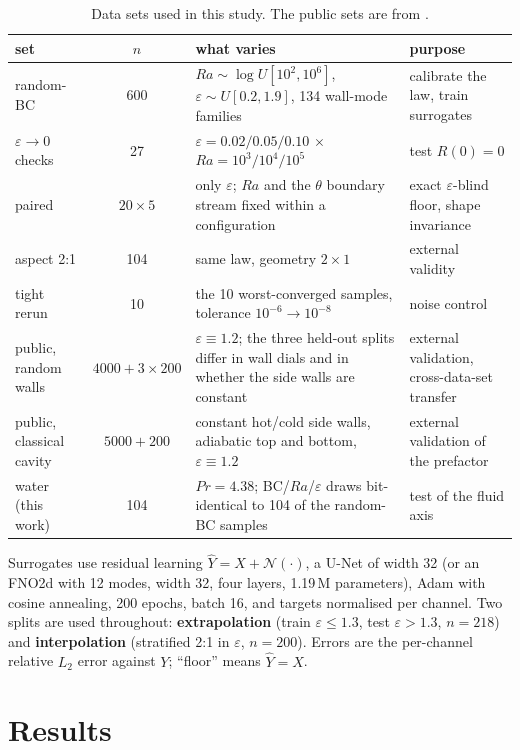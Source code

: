\documentclass[11pt,a4paper]{article}
\begin{document}
\begin{table}[htbp]
\centering
\footnotesize
\setlength{\tabcolsep}{4pt}
\caption{Data sets used in this study. The public sets are from
\citet{menglik2026neural}.}
\label{tab:data}
\begin{tabular}{@{}p{4.2cm}c p{5.8cm}p{3.7cm}@{}}
\toprule
set & $n$ & what varies & purpose\\
\midrule
random-BC & 600 & $Ra\sim\log U[10^2,10^6]$, $\varepsilon\sim U[0.2,1.9]$, 134 wall-mode
families & calibrate the law, train surrogates\\
$\varepsilon\to0$ checks & 27 & $\varepsilon=0.02/0.05/0.10$ $\times$ $Ra=10^3/10^4/10^5$ &
test $R(0)=0$\\
paired & $20\times5$ & only $\varepsilon$; $Ra$ and the $\theta$ boundary stream fixed within a
configuration & exact $\varepsilon$-blind floor, shape invariance\\
aspect 2:1 & 104 & same law, geometry $2\times1$ & external validity\\
tight rerun & 10 & the 10 worst-converged samples, tolerance $10^{-6}\to10^{-8}$ & noise control\\
public, random walls \citep{menglik2026neural} & $4000+3\times200$ & $\varepsilon\equiv1.2$; the
three held-out splits differ in wall dials and in whether the side walls are constant & external
validation, cross-data-set transfer\\
public, classical cavity \citep{menglik2026neural} & $5000+200$ & constant hot/cold side walls,
adiabatic top and bottom, $\varepsilon\equiv1.2$ & external validation of the prefactor\\
water (this work) & 104 & $Pr=4.38$; BC/$Ra$/$\varepsilon$ draws bit-identical to 104 of the
random-BC samples & test of the fluid axis\\
\bottomrule
\end{tabular}
\end{table}

Surrogates use residual learning $\hat Y=X+\mathcal{N}(\cdot)$, a U-Net of width 32 (or an FNO2d
with 12 modes, width 32, four layers, 1.19\,M parameters), Adam with cosine annealing, 200 epochs,
batch 16, and targets normalised per channel. Two splits are used throughout:
\textbf{extrapolation} (train $\varepsilon\le1.3$, test $\varepsilon>1.3$, $n=218$) and
\textbf{interpolation} (stratified 2:1 in $\varepsilon$, $n=200$). Errors are the per-channel
relative $L_2$ error against $Y$; ``floor'' means $\hat Y=X$.

\section{Results}
\label{sec:results}
\end{document}

